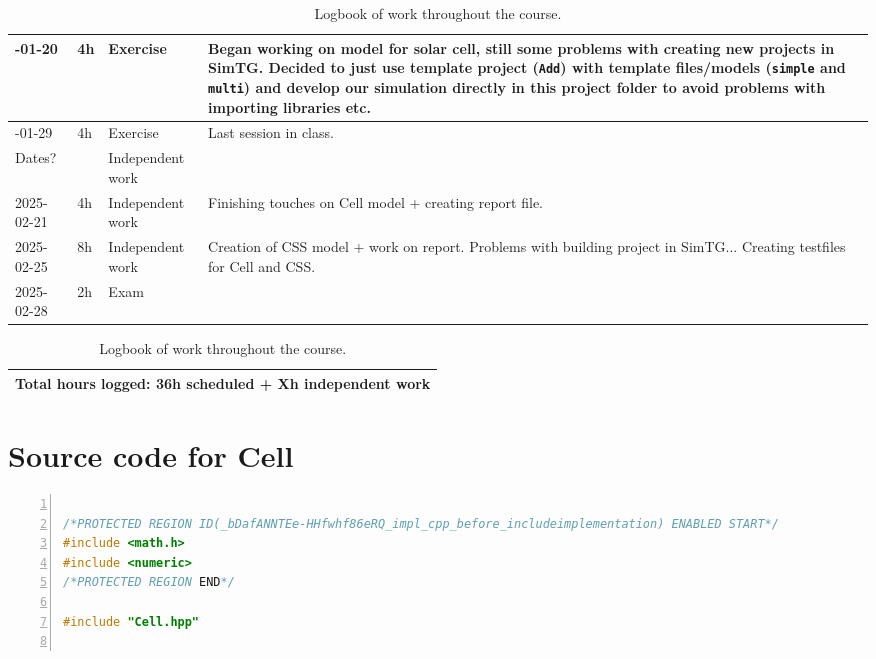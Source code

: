 \begin{appendices}
\begin{table}[H]
\begin{tabularx}{\textwidth} {
    | >{\hsize=0.45\hsize}X     %
    | >{\hsize=0.2\hsize}X     %
    | >{\hsize=0.4\hsize}X      %
    | >{\hsize=1.95\hsize}X      %
    |}
        2025-01-20 & 4h & Exercise & Began working on model for solar cell, still some problems with creating new projects in SimTG. Decided to just use template project (\texttt{Add}) with template files/models (\texttt{simple} and \texttt{multi}) and develop our simulation directly in this project folder to avoid problems with importing libraries etc.     
        \\ \hline
        
        2025-01-29 & 4h & Exercise & Last session in class.  \\ \hline
        
        Dates?     && Independent work & \\ \hline

        2025-02-21 & 4h & Independent work & Finishing touches on Cell model + creating report file. \\ \hline

        2025-02-25 & 8h & Independent work & Creation of CSS model + work on report. Problems with building project in SimTG... Creating testfiles for Cell and CSS. \\ \hline
        
        2025-02-28 & 2h & Exam &  \\ \hline
    \end{tabularx}
    \begin{tabularx}{\textwidth} {|X|}
         \hline
         \textbf{Total hours logged: 36h scheduled + Xh independent work} \\ \hline
    \end{tabularx}

    
    \caption{Logbook of work throughout the course.}
    \label{tab:logbook}
    
\end{table}






\newpage
\section{Source code for Cell}
\begin{lstlisting}[frame=single,
numbers=left, basicstyle=\tiny, language = C++]

/*PROTECTED REGION ID(_bDafANNTEe-HHfwhf86eRQ_impl_cpp_before_includeimplementation) ENABLED START*/
#include <math.h>
#include <numeric>
/*PROTECTED REGION END*/

#include "Cell.hpp"


\end{lstlisting}
\end{appendices}
